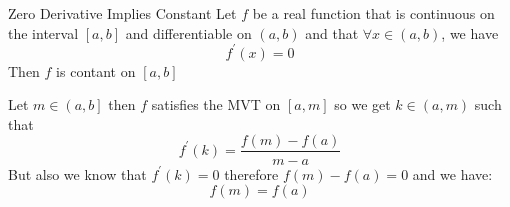 \documentclass{standalone}
\begin{document}
\begin{theo*}{Zero Derivative Implies Constant}
  Let $f$ be a real function that is continuous on the interval $ \left[ a, b \right]$ and differentiable on $ \left(  a, b \right)$ and that $\forall x \in \left( a , b \right)$, we have 
  \[
  f ^{\prime}\left(x\right) = 0
  \]
  Then $f$ is contant on $ \left[ a, b\right]$ 
  \begin{pf}
    Let $m \in \left( a, b \right]$ then $f$ satisfies the MVT on $ \left[ a, m \right]$ so we get $k \in \left( a, m \right)$ such that 
    \[
    f ^{\prime}\left(k\right) = \frac{f\left(m\right)  -  f\left(a\right)}{m  -  a}
    \]
    But also we know that $f ^{\prime}\left(k\right) = 0$ therefore $f\left(m\right)  -  f\left(a\right) = 0$ and we have:
    \[
    f\left(m\right) = f\left(a\right)
    \]
  \end{pf}
\end{theo*}
\end{document}
